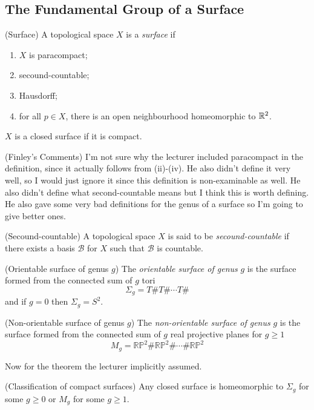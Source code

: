 \documentclass{article}
\begin{document}
\subsection{The Fundamental Group of a Surface}
\begin{definition}
	(Surface) A topological space $ X $ is a \textit{surface} if
	\begin{enumerate}
		\item $ X $ is paracompact;
		\item secound-countable;
		\item Hausdorff;
		\item for all $ p\in X $, there is an open neighbourhood homeomorphic to $ \mathbb{R}^2 $.
	\end{enumerate}
	$ X $ is a closed surface if it is compact.
\end{definition}
\begin{remark}
	(Finley's Comments) I'm not sure why the lecturer included paracompact in the definition, since it actually follows from (ii)-(iv). He also didn't define it very well, so I would just ignore it since this definition is non-examinable as well. He also didn't define what second-countable means but I think this is worth defining. He also gave some very bad definitions for the genus of a surface so I'm going to give better ones.
\end{remark}
\begin{definition}
	(Secound-countable) A topological space $ X $ is said to be \textit{secound-countable} if there exists a basis $ \mathcal B $ for $ X $ such that $ \mathcal B $ is countable.
\end{definition}
\begin{definition}
	(Orientable surface of genus $ g $) The \textit{orientable surface of genus} $ g $ is the surface formed from the connected sum of $ g $ tori
	\[
	  \Sigma_g = T \# T\# \cdots T\#
	\]
	and if $ g=0 $ then $ \Sigma_g = S^2 $.
\end{definition}
\begin{definition}
	(Non-orientable surface of genus $ g $) The \textit{non-orientable surface of genus} $ g $ is the surface formed from the connected sum of $ g $ real projective planes for $ g \ge 1 $
	\[
		M_g = \mathbb{RP}^2 \# \mathbb{RP}^2 \# \cdots \# \mathbb{RP}^2
	\]
\end{definition}
Now for the theorem the lecturer implicitly assumed.
\begin{theorem}
	(Classification of compact surfaces) Any closed surface is homeomorphic to $ \Sigma_g $ for some $ g\ge 0 $ or $ M_g $ for some $ g\ge 1 $.
\end{theorem}
\end{document}

